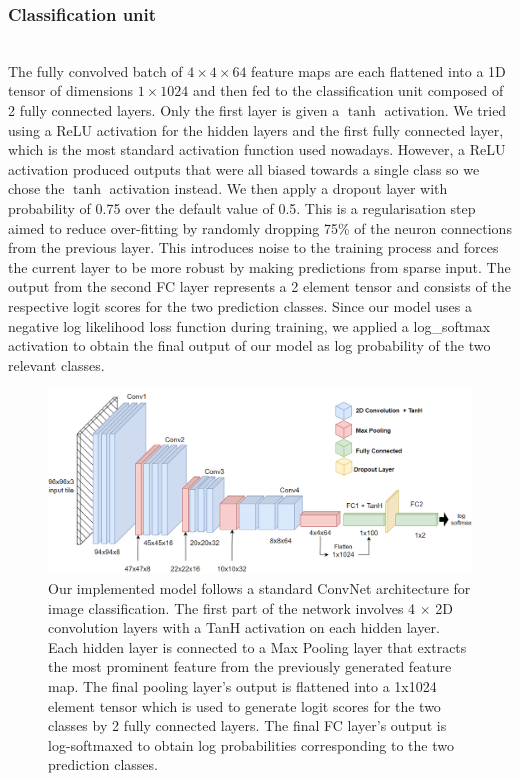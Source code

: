 \documentclass{l4proj}
\begin{document}
\subsubsection{Classification unit}\hfill\\
The fully convolved batch of \(4 \times 4 \times 64\) feature maps are each flattened into a 1D tensor of dimensions \(1 \times 1024\) and then fed to the classification unit composed of 2 fully connected layers. Only the first layer is given a \(\tanh\) activation. We tried using a ReLU activation for the hidden layers and the first fully connected layer, which is the most standard activation function used nowadays. However, a ReLU activation produced outputs that were all biased towards a single class so we chose the \(\tanh\) activation instead. We then apply a dropout layer with  probability of 0.75 over the default value of 0.5. This is a regularisation step aimed to reduce over-fitting by randomly dropping 75\% of the neuron connections from the previous layer. This introduces noise to the training process and forces the current layer to be more robust by making predictions from sparse input. The  output from the second FC layer represents a 2 element tensor and consists of the respective logit scores for the two prediction classes. Since our model uses a negative log likelihood loss function during training, we applied a log\_softmax activation to obtain the final output of our model as log probability of the two relevant classes. 

\begin{figure}[h]
    \centering
    \includegraphics[scale=0.5]{images/CNN-arch.png}
    \caption{Our implemented model follows a standard ConvNet architecture for image classification. The first part of the network involves 4 \(\times\) 2D convolution layers with a TanH activation on each hidden layer. Each hidden layer is connected to a Max Pooling layer that extracts the most prominent feature from the previously generated feature map. The final pooling layer's output is flattened into a 1x1024 element tensor which is used to generate logit scores for the two classes by 2 fully connected layers. The final FC layer's output is log-softmaxed to obtain log probabilities corresponding to the two prediction classes.}
    \label{fig:CNN-Arch-diagram}
\end{figure}
 
\end{document}
